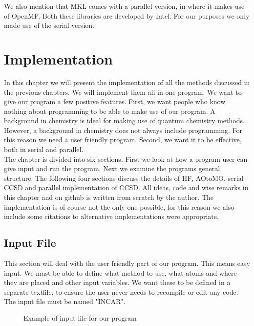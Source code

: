 \documentclass[a4paper,norsk,11pt,twoside]{report}
\begin{document}
We also mention that MKL comes with a parallel version, in where it makes use of OpenMP. Both these libraries are developed by Intel. For our purposes we only made use of the serial version. 











\chapter{Implementation}
In this chapter we will present the implementation of all the methods discussed in the previous chapters. We will implement them all in one program. We want to give our program a few positive features. First, we want people who know nothing about programming to be able to make use of our program. A background in chemistry is ideal for making use of quantum chemistry methods. However, a background in chemistry does not always include programming. For this reason we need a user friendly program. Second, we want it to be effective, both in serial and parallel. \\

The chapter is divided into six sections. First we look at how a program user can give input and run the program. Next we examine the programs general structure. The following four sections discuss the details of HF, AOtoMO, serial CCSD and parallel implementation of CCSD. All ideas, code and wise remarks in this chapter and on github is written from scratch by the author. The implementation is of course not the only one possible, for this reason we also include some citations to alternative implementations were appropriate. 

\section{Input File}
This section will deal with the user friendly part of our program. This means easy input. We must be able to define what method to use, what atoms and where they are placed and other input variables. We want these to be defined in a separate textfile, to ensure the user  never needs to recompile or edit any code. The input file must be named "INCAR". \\

\begin{figure}[h!]
\begin{center}
\caption{Example of input file for our program}
\label{fig:inputfile100}
\end{center}
\end{figure}
\end{document}
